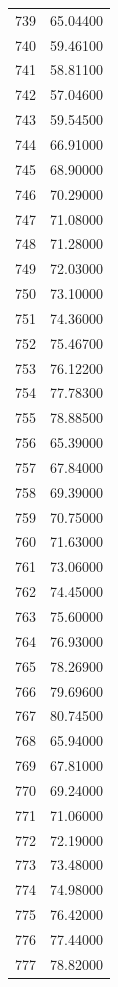\documentclass[
  letterpaper,
  DIV=11,
  numbers=noendperiod]{scrreprt}
\begin{document}
\begin{tcolorbox}
\begin{tabular}{lr}
739  &         65.04400 \\
740  &         59.46100 \\
741  &         58.81100 \\
742  &         57.04600 \\
743  &         59.54500 \\
744  &         66.91000 \\
745  &         68.90000 \\
746  &         70.29000 \\
747  &         71.08000 \\
748  &         71.28000 \\
749  &         72.03000 \\
750  &         73.10000 \\
751  &         74.36000 \\
752  &         75.46700 \\
753  &         76.12200 \\
754  &         77.78300 \\
755  &         78.88500 \\
756  &         65.39000 \\
757  &         67.84000 \\
758  &         69.39000 \\
759  &         70.75000 \\
760  &         71.63000 \\
761  &         73.06000 \\
762  &         74.45000 \\
763  &         75.60000 \\
764  &         76.93000 \\
765  &         78.26900 \\
766  &         79.69600 \\
767  &         80.74500 \\
768  &         65.94000 \\
769  &         67.81000 \\
770  &         69.24000 \\
771  &         71.06000 \\
772  &         72.19000 \\
773  &         73.48000 \\
774  &         74.98000 \\
775  &         76.42000 \\
776  &         77.44000 \\
777  &         78.82000 \\

\end{tabular}
\end{tcolorbox}
\end{document}
